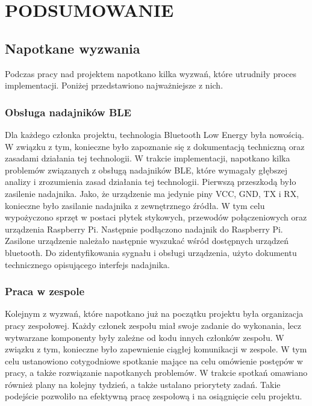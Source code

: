 \chapter{PODSUMOWANIE}
\label{chapter:podsumowanie}

\section{Napotkane wyzwania}

Podczas pracy nad projektem napotkano kilka wyzwań, które utrudniły proces implementacji. Poniżej przedstawiono najważniejsze z nich.

\subsection{Obsługa nadajników BLE}
Dla każdego członka projektu, technologia Bluetooth Low Energy była nowością. W związku z tym, konieczne było zapoznanie się z dokumentacją techniczną oraz zasadami działania tej technologii. W trakcie implementacji, napotkano kilka problemów związanych z obsługą nadajników BLE, które wymagały głębszej analizy i zrozumienia zasad działania tej technologii.
Pierwszą przeszkodą było zasilenie nadajnika. Jako, że urządzenie ma jedynie piny VCC, GND, TX i RX, konieczne było zasilanie nadajnika z zewnętrznego źródła. W tym celu wypożyczono sprzęt w postaci płytek stykowych, przewodów połączeniowych oraz urządzenia Raspberry Pi. Następnie podłączono nadajnik do Raspberry Pi. 
Zasilone urządzenie należało następnie wyszukać wśród dostępnych urządzeń bluetooth. Do zidentyfikowania sygnału i obsługi urządzenia, użyto dokumentu technicznego opisującego interfejs nadajnika. \cite{hm10datasheet}

\subsection{Praca w zespole}
Kolejnym z wyzwań, które napotkano już na początku projektu była organizacja pracy zespołowej. Każdy członek zespołu miał swoje zadanie do wykonania, lecz wytwarzane komponenty były zależne od kodu innych członków zespołu. W związku z tym, konieczne było zapewnienie ciągłej komunikacji w zespole.
W tym celu ustanowiono cotygodniowe spotkanie mające na celu omówienie postępów w pracy, a także rozwiązanie napotkanych problemów. W trakcie spotkań omawiano również plany na kolejny tydzień, a także ustalano priorytety zadań. Takie podejście pozwoliło na efektywną pracę zespołową i na osiągnięcie celu projektu.

